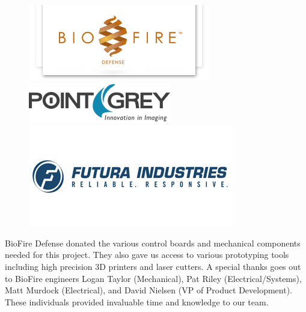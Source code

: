 \documentclass[final, letterpaper, 10 pt, conference, twocolumn]{IEEEtran}
\begin{document}
\begin{figure}[!hb]
\begin{center}
  \includegraphics[width=\linewidth]{biofire_logo.png}
  \label{fig:biofire_logo}
\endminipage\hfill
{}
  \includegraphics[width=\linewidth]{point_grey.png}
  \label{fig:point_grey}
\endminipage\hfill
{}%
  \includegraphics[width=\linewidth]{futura_indust.jpg}
  \label{fig:futura_indst}
\endminipage
\label{fig:project_sponsors}
\end{center}
\end{figure}

BioFire Defense donated the various control boards and mechanical components needed for this project. They also gave us access to various prototyping tools including high precision 3D printers and laser cutters. A special thanks goes out to BioFire engineers Logan Taylor (Mechanical), Pat Riley (Electrical/Systems), Matt Murdock (Electrical), and David Nielsen (VP of Product Development). These individuals provided invaluable time and knowledge to our team.
\end{document}
